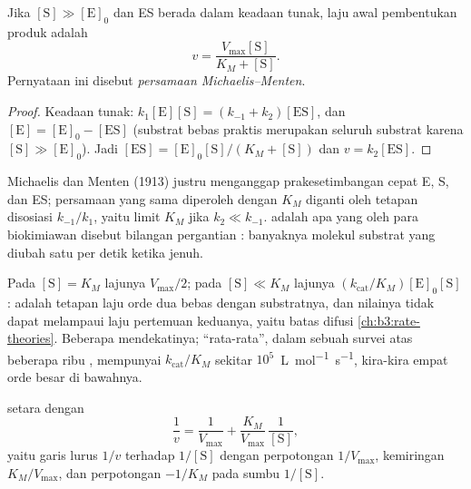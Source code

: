 \begin{theorem}\label{thm:b3:complex-kinetics:michaelis-menten}
Jika $[\mathrm S] \gg [\mathrm E]_0$ dan ES berada dalam keadaan tunak, laju awal
pembentukan produk adalah
\[
  v = \frac{V_{\max}[\mathrm S]}{K_M + [\mathrm S]} .
\]
Pernyataan ini disebut \emph{persamaan Michaelis--Menten}.
\end{theorem}

\begin{proof}
Keadaan tunak: $k_1[\mathrm E][\mathrm S] = (k_{-1} + k_2)[\mathrm{ES}]$, dan
$[\mathrm E] = [\mathrm E]_0 - [\mathrm{ES}]$ (substrat bebas praktis merupakan seluruh
substrat karena $[\mathrm S] \gg [\mathrm E]_0$). Jadi $[\mathrm{ES}]
= [\mathrm E]_0[\mathrm S]/(K_M + [\mathrm S])$ dan $v = k_2[\mathrm{ES}]$.
\end{proof}

\begin{remark}
Michaelis dan Menten (1913) justru menganggap prakesetimbangan cepat E, S, dan
ES; persamaan yang sama diperoleh dengan $K_M$ diganti oleh tetapan disosiasi
$k_{-1}/k_1$, yaitu limit $K_M$ jika $k_2 \ll k_{-1}$.  adalah
apa yang oleh para biokimiawan disebut bilangan pergantian : banyaknya
molekul substrat yang diubah satu  per detik ketika jenuh.
\end{remark}

Pada $[\mathrm S] = K_M$ lajunya $V_{\max}/2$; pada $[\mathrm S] \ll K_M$ lajunya
$(k_{\mathrm{cat}}/K_M)[\mathrm E]_0[\mathrm S]$:  adalah tetapan laju
orde dua  bebas dengan substratnya, dan nilainya tidak dapat melampaui
laju pertemuan keduanya, yaitu batas difusi \cref{ch:b3:rate-theories}.
Beberapa  mendekatinya;  ``rata-rata'', dalam sebuah survei atas
beberapa ribu , mempunyai $k_{\mathrm{cat}}/K_M$ sekitar
$10^5$~\unit{L.mol^{-1}.s^{-1}}, kira-kira empat orde besar di bawahnya.

\begin{proposition}\label{prop:b3:complex-kinetics:lineweaver}
 setara dengan
\[
  \frac1v = \frac{1}{V_{\max}} + \frac{K_M}{V_{\max}}\,\frac{1}{[\mathrm S]},
\]
yaitu garis lurus $1/v$ terhadap $1/[\mathrm S]$ dengan perpotongan $1/V_{\max}$,
kemiringan $K_M/V_{\max}$, dan perpotongan $-1/K_M$ pada sumbu $1/[\mathrm S]$.
\end{proposition}

